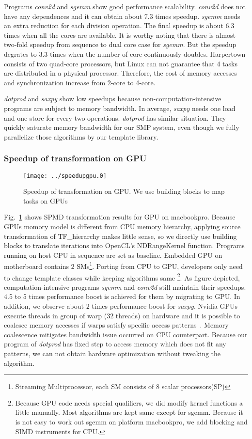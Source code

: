 Programs \textit{conv2d} and \textit{sgemm} show good performance scalability. \textit{conv2d} does not have any dependences
and it can obtain about 7.3 times speedup. \textit{sgemm}
needs an extra reduction for each division operation. The final
speedup is about 6.3 times when all the cores are available. It is
worthy noting that there is almost two-fold speedup from sequence to
dual core case for \textit{sgemm}. But
the speedup degrates to 3.3 times when the number of core continuously
doubles. Harpertown consists of two quad-core processors,  but Linux
can not guarantee that 4 tasks are distributed in a physical
processor. Therefore, the cost of memory accesses and synchronization
increase from 2-core to 4-core.

\textit{dotprod} and \textit{saxpy} show low speedups because non-computation-intensive
programs are subject to memory bandwidth.  In average, \textit{saxpy} needs one load and one 
store for every two operations. \textit{dotprod} has similar
situation. They quickly saturate memory bandwidth for our SMP system, even though we fully parallelize those
algorithms by our template library. 

\subsubsection{Speedup of  transformation on GPU}\label{exp:2}

\begin{figure}
\texttt{[image: ../speedupgpu.0]}
\caption{Speedup of transformation on GPU. We use building blocks to
  map tasks on GPUs}\label{fig:spdgpu}
\end{figure}

Fig.~\ref{fig:spdgpu} shows SPMD transformation results for GPU on
macbookpro. Because GPUs momory model is different from CPU memory
hierarchy, applying source transformation of TF\_hierarchy makes
little sense, so we directly use building
blocks to translate iterations into OpenCL's NDRangeKernel
function. Programs running on host CPU  in sequence are set as
baseline. Embedded GPU on motherboard contains 2
SMs\footnote{Streaming Multiprocessor, each SM consists of 8 scalar processors(SP)}.
Porting from CPU to GPU, developers only need to change
template classes while keeping algorithms same \footnote{
Because GPU code needs special qualifiers, we did modify kernel
functions a little manually.  Most algorithms are kept same except for
sgemm.  Because it is not easy
 to work out sgemm on platform macbookpro, we add blocking and SIMD
 instruments for CPU.}. As figure depicted,  computation-intensive programs
\textit{sgemm} and \textit{conv2d} still maintain their speedups. 4.5 to 5 times
performance boost is achieved for them by migrating to GPU.
In addition, we observe about 2 times performance boost for
\textit{saxpy}. Nvidia GPUs execute
threads in group of warp (32 threads) on hardware and it is
possible to coalesce memory accesses if warps satisfy
specific access patterns~\cite{nvopencl}. Memory coalescence mitigates bandwidth issue
occurred on CPU counterpart. Because our program of \textit{dotprod} has fixed
step to access memory which does not fit any patterns, we can not
obtain hardware optimization without tweaking the algorithm.

